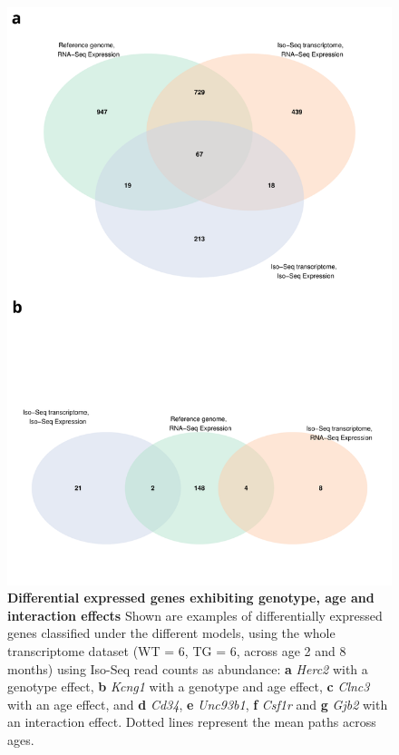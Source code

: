 \begin{figure}[h]
	\centering
	\includegraphics[page=6,scale = 0.55]{Figures/WholeDifferentialAnalysis.pdf}
	\captionsetup{width=0.95\textwidth}
	\caption[Examples of gene expression differing across conditions]%
	{\textbf{Differential expressed genes exhibiting genotype, age and interaction effects} Shown are examples of differentially expressed genes classified under the different models, using the whole transcriptome dataset (WT = 6, TG = 6, across age 2 and 8 months) using Iso-Seq read counts as abundance: \textbf{a} \textit{Herc2} with a genotype effect, \textbf{b} \textit{Kcng1} with a genotype and age effect, \textbf{c} \textit{Clnc3} with an age effect, and \textbf{d} \textit{Cd34}, \textbf{e} \textit{Unc93b1}, \textbf{f} \textit{Csf1r} and \textbf{g} \textit{Gjb2} with an interaction effect. Dotted lines represent the mean paths across ages.}   
	\label{fig:dea_model_genexp}
\end{figure}

